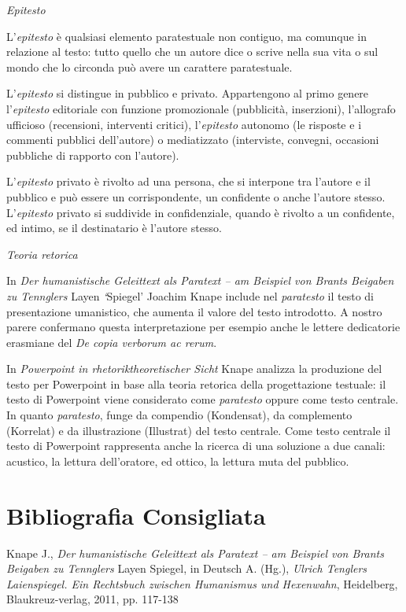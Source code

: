 {\emph{Epitesto}

L'\emph{epitesto} è qualsiasi elemento paratestuale non contiguo, ma
comunque in relazione al testo: tutto quello che un autore dice o scrive
nella sua vita o sul mondo che lo circonda può avere un carattere
paratestuale.

L'\emph{epitesto} si distingue in pubblico e privato. Appartengono al
primo genere l'\emph{epitesto} editoriale con funzione promozionale
(pubblicità, inserzioni), l'allografo ufficioso (recensioni, interventi
critici), l'\emph{epitesto} autonomo (le risposte e i commenti pubblici
dell'autore) o mediatizzato (interviste, convegni, occasioni pubbliche
di rapporto con l'autore).

L'\emph{epitesto} privato è rivolto ad una persona, che si interpone tra
l'autore e il pubblico e può essere un corrispondente, un confidente o
anche l'autore stesso. L'\emph{epitesto} privato si suddivide in
confidenziale, quando è rivolto a un confidente, ed intimo, se il
destinatario è l'autore stesso.

\emph{Teoria retorica}

In \emph{Der humanistische Geleittext als Paratext -- am Beispiel von
Brants Beigaben zu Tennglers} Layen \emph{`}Spiegel' Joachim Knape
include nel \emph{paratesto} il testo di presentazione umanistico, che
aumenta il valore del testo introdotto. A nostro parere confermano
questa interpretazione per esempio anche le lettere dedicatorie
erasmiane del \emph{De copia verborum ac rerum}.

In \emph{Powerpoint in rhetoriktheoretischer Sicht} Knape analizza la
produzione del testo per Powerpoint in base alla teoria retorica della
progettazione testuale: il testo di Powerpoint viene considerato come
\emph{paratesto} oppure come testo centrale. In quanto \emph{paratesto},
funge da compendio (Kondensat), da complemento (Korrelat) e da
illustrazione (Illustrat) del testo centrale. Come testo centrale il
testo di Powerpoint rappresenta anche la ricerca di una soluzione a due
canali: acustico, la lettura dell'oratore, ed ottico, la lettura muta
del pubblico.

\section*{Bibliografia Consigliata}
{\parindent0pt 
Knape J., \emph{Der humanistische Geleittext als Paratext -- am Beispiel
von Brants Beigaben zu Tennglers} Layen Spiegel, in Deutsch A. (Hg.),
\emph{Ulrich Tenglers Laienspiegel. Ein Rechtsbuch zwischen Humanismus
und Hexenwahn}, Heidelberg, Blaukreuz-verlag, 2011, pp. 117-138

}}
